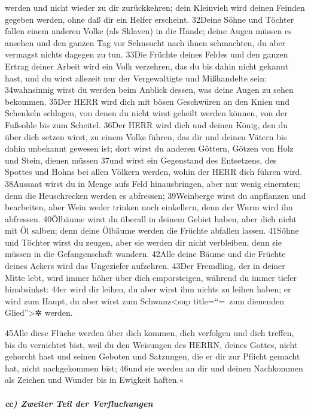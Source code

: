 werden und nicht wieder zu dir zurückkehren; dein Kleinvieh wird deinen
Feinden gegeben werden, ohne daß dir ein Helfer erscheint. 32Deine Söhne
und Töchter fallen einem anderen Volke (als Sklaven) in die Hände; deine
Augen müssen es ansehen und den ganzen Tag vor Sehnsucht nach ihnen
schmachten, du aber vermagst nichts dagegen zu tun. 33Die Früchte deines
Feldes und den ganzen Ertrag deiner Arbeit wird ein Volk verzehren, das
du bis dahin nicht gekannt hast, und du wirst allezeit nur der
Vergewaltigte und Mißhandelte sein: 34wahnsinnig wirst du werden beim
Anblick dessen, was deine Augen zu sehen bekommen. 35Der HERR wird dich
mit bösen Geschwüren an den Knien und Schenkeln schlagen, von denen du
nicht wirst geheilt werden können, von der Fußsohle bis zum Scheitel.
36Der HERR wird dich und deinen König, den du über dich setzen wirst, zu
einem Volke führen, das dir und deinen Vätern bis dahin unbekannt
gewesen ist; dort wirst du anderen Göttern, Götzen von Holz und Stein,
dienen müssen 37und wirst ein Gegenstand des Entsetzens, des Spottes und
Hohns bei allen Völkern werden, wohin der HERR dich führen wird.
38Aussaat wirst du in Menge aufs Feld hinausbringen, aber nur wenig
einernten; denn die Heuschrecken werden es abfressen; 39Weinberge wirst
du anpflanzen und bearbeiten, aber Wein weder trinken noch einkellern,
denn der Wurm wird ihn abfressen. 40Ölbäume wirst du überall in deinem
Gebiet haben, aber dich nicht mit Öl salben; denn deine Ölbäume werden
die Früchte abfallen lassen. 41Söhne und Töchter wirst du zeugen, aber
sie werden dir nicht verbleiben, denn sie müssen in die Gefangenschaft
wandern. 42Alle deine Bäume und die Früchte deines Ackers wird das
Ungeziefer aufzehren. 43Der Fremdling, der in deiner Mitte lebt, wird
immer höher über dich emporsteigen, während du immer tiefer hinabsinkst:
44er wird dir leihen, du aber wirst ihm nichts zu leihen haben; er wird
zum Haupt, du aber wirst zum Schwanz\textless sup title=``=~zum
dienenden Glied''\textgreater✲ werden.

45Alle diese Flüche werden über dich kommen, dich verfolgen und dich
treffen, bis du vernichtet bist, weil du den Weisungen des HERRN, deines
Gottes, nicht gehorcht hast und seinen Geboten und Satzungen, die er dir
zur Pflicht gemacht hat, nicht nachgekommen bist; 46und sie werden an
dir und deinen Nachkommen als Zeichen und Wunder bis in Ewigkeit
haften.«

\hypertarget{cc-zweiter-teil-der-verfluchungen}{%
\subparagraph{cc) Zweiter Teil der
Verfluchungen}\label{cc-zweiter-teil-der-verfluchungen}}

